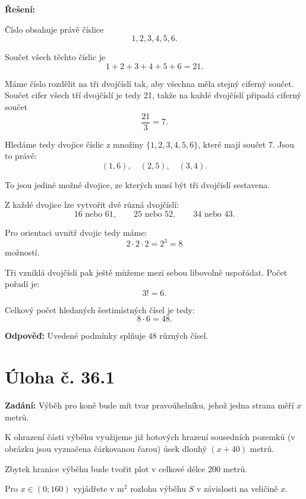 \documentclass[12pt,a4paper]{article}
\begin{document}
\bigskip

\textbf{Řešení:}

Číslo obsahuje právě číslice
\[
1,2,3,4,5,6.
\]

Součet všech těchto číslic je
\[
1+2+3+4+5+6=21.
\]

Máme číslo rozdělit na tři dvojčíslí tak, aby všechna měla stejný ciferný součet.  
Součet cifer všech tří dvojčíslí je tedy 21, takže na každé dvojčíslí připadá ciferný součet
\[
\frac{21}{3}=7.
\]

\medskip

Hledáme tedy dvojice číslic z množiny \(\{1,2,3,4,5,6\}\), které mají součet 7. Jsou to právě:
\[
(1,6),\quad (2,5),\quad (3,4).
\]

To jsou jediné možné dvojice, ze kterých musí být tři dvojčíslí sestavena.

\medskip

Z každé dvojice lze vytvořit dvě různá dvojčíslí:
\[
16 \text{ nebo } 61,\qquad
25 \text{ nebo } 52,\qquad
34 \text{ nebo } 43.
\]

Pro orientaci uvnitř dvojic tedy máme:
\[
2\cdot 2\cdot 2 = 2^3 = 8
\]
možností.

\medskip

Tři vzniklá dvojčíslí pak ještě můžeme mezi sebou libovolně uspořádat.  
Počet pořadí je:
\[
3! = 6.
\]

Celkový počet hledaných šestimístných čísel je tedy:
\[
8\cdot 6 = 48.
\]

\bigskip

\textbf{Odpověď:}  
Uvedené podmínky splňuje \(48\) různých čísel.




\newpage
\section*{Úloha č. 36.1}

\textbf{Zadání:}  
Výběh pro koně bude mít tvar pravoúhelníku, jehož jedna strana měří \(x\) metrů.

K ohrazení části výběhu využijeme již hotových hrazení sousedních pozemků  
(v obrázku jsou vyznačena čárkovanou čarou) úsek dlouhý \((x+40)\) metrů.

Zbytek hranice výběhu bude tvořit plot v celkové délce \(200\) metrů.

Pro \(x \in (0;160)\) vyjádřete v \(\mathrm{m}^2\) rozlohu výběhu \(S\) v závislosti na veličině \(x\).
\end{document}
